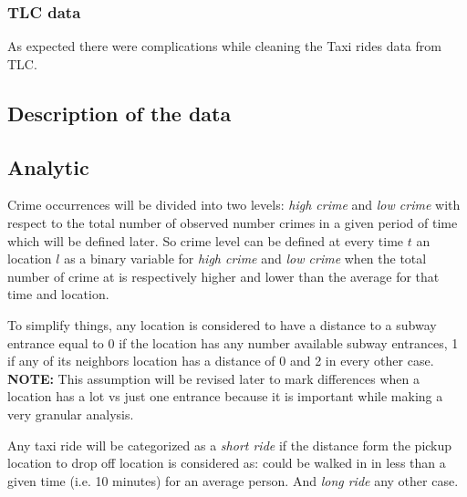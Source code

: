 \documentclass{sigkddExp}
\begin{document}
\subsubsection{TLC data}
As expected there were complications while cleaning the Taxi rides data from TLC.

\subsection{Description of the data}


\subsection{Analytic}

Crime occurrences will be divided into  two levels: \textit{high crime} and  \textit{low crime} with respect to the total number of observed number crimes in a given period of time which will be defined later.
So crime level can be defined at every time $t$ an location $l$ as a binary variable for \textit{high crime} and \textit{low crime} when the total number of crime at is respectively higher and lower  than the average for that time and location.

To simplify things, any location is considered to have a  distance to a subway entrance equal to 0 if the location has any number available subway entrances,  1 if any of its neighbors location has a distance of 0 and 2 in every other case. \textbf{NOTE:} This assumption will be revised later to mark differences when a location has a lot vs just one entrance because it is important while making a very granular analysis.


Any taxi ride will be categorized as a \textit{short ride} if the distance form the pickup location to drop off location is considered as: could be walked in in less than a given time (i.e. 10 minutes) for an average person. And \textit{long ride} any other case.
\end{document}
